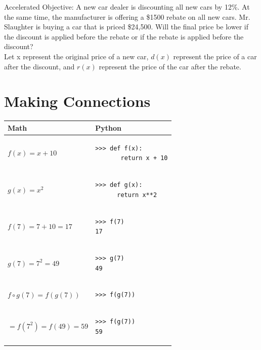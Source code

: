 \documentclass[12pt]{article}
\let\stdsection\section
\renewcommand\section{\newpage\stdsection}
\begin{document}
Accelerated Objective: A new car dealer is discounting all new cars by 12\%. At the same time, the manufacturer is offering a \$1500 rebate on all new cars. Mr. Slaughter is buying a car that is priced \$24,500. Will the final price be lower if the discount is applied before the rebate or if the rebate is applied before the discount?\\

Let x represent the original price of a new car, $d(x)$ represent the price of a car after the discount, and $r(x)$ represent the price of the car after the rebate.

\section*{Making Connections}

\newcommand{\negspace}{\vspace{-1.5\baselineskip}}

\begin{center}
\bgroup
\def\arraystretch{1.5}
\begin{tabular}{l | p{2.0in}}
Math & Python \\ \hline

$ f(x) = x + 10 $ 
& 
\negspace
\begin{verbatim}
>>> def f(x):
       return x + 10
\end{verbatim}\\

$ g(x) = x^{2} $ &
\negspace
\begin{verbatim}
>>> def g(x):
      return x**2
\end{verbatim}\\ \hline

$ f(7) = 7 + 10 = 17 $ &
\negspace
\begin{verbatim}
>>> f(7)
17
\end{verbatim}\\

$ g(7) = 7^{2} = 49 $ &
\negspace
\begin{verbatim}
>>> g(7)
49
\end{verbatim}\\ \hline

$ f \circ g(7) = f(g(7))$ &
\negspace
\begin{verbatim}
>>> f(g(7))
\end{verbatim}\\

$= f(7^{2}) = f(49) = 59 $ &
\negspace
\begin{verbatim}
>>> f(g(7))
59
\end{verbatim}

\end{tabular}
\egroup
\end{center}
\end{document}
